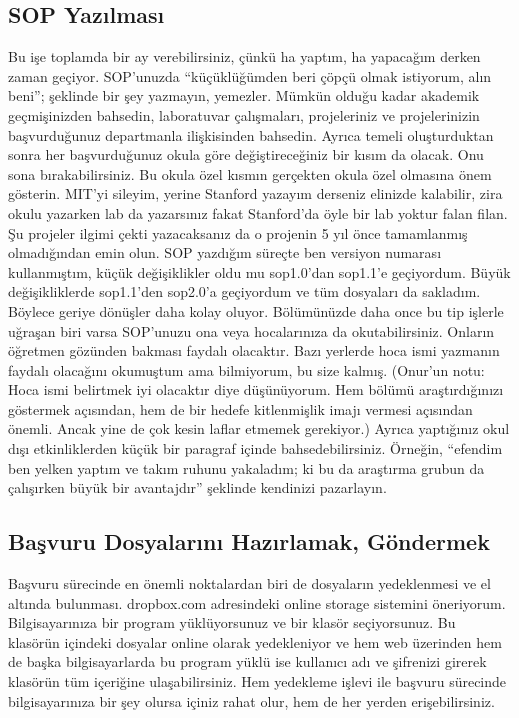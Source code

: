 \documentclass[12pt,a4paper]{article}
\begin{document}
\subsection{SOP Yazılması}
Bu işe toplamda bir ay verebilirsiniz, çünkü ha yaptım, ha yapacağım derken zaman geçiyor. SOP'unuzda ``küçüklüğümden beri çöpçü olmak istiyorum, alın beni''; şeklinde bir şey yazmayın, yemezler. Mümkün olduğu kadar akademik geçmişinizden bahsedin, laboratuvar çalışmaları, projeleriniz ve projelerinizin başvurduğunuz departmanla ilişkisinden bahsedin. Ayrıca temeli oluşturduktan sonra her başvurduğunuz okula göre değiştireceğiniz bir kısım da olacak. Onu sona bırakabilirsiniz. Bu okula özel kısmın gerçekten okula özel olmasına önem gösterin. MIT'yi sileyim, yerine Stanford yazayım derseniz eli\-nizde kalabilir, zira okulu yazarken lab da yazarsınız fakat Stanford'da öyle bir lab yoktur falan filan. Şu projeler ilgimi çekti yazacaksanız da o projenin 5 yıl önce tamamlanmış olmadığından emin olun. SOP yazdığım süreçte ben versiyon numarası kullanmıştım, küçük değişiklikler oldu mu sop1.0’dan sop1.1’e geçiyordum. Büyük değişikliklerde sop1.1’den sop2.0’a geçiyordum ve tüm dosyaları da sakladım. Böylece geriye dönüşler daha kolay oluyor. Bölümünüzde daha once bu tip işlerle uğraşan biri varsa SOP'unuzu ona veya hocalarınıza da okutabilirsiniz. Onların öğretmen gözünden bakması faydalı olacaktır. Bazı yerlerde hoca ismi yazmanın faydalı olacağını okumuştum ama bilmiyorum, bu size kalmış. (Onur'un notu: Hoca ismi belirtmek iyi olacaktır diye düşünüyorum. Hem bölümü araştırdığınızı göstermek açısından, hem de bir hedefe kitlenmişlik imajı vermesi açısından önemli. Ancak yine de çok kesin laflar etmemek gerekiyor.) Ayrıca yaptığınız okul dışı etkinliklerden küçük bir paragraf içinde bahsedebilirsiniz. Örneğin, ``efendim ben yelken yaptım ve takım ruhunu yakaladım; ki bu da araştırma grubun da çalışırken büyük bir avantajdır'' şeklinde  kendinizi pazarlayın. 

\subsection{Başvuru Dosyalarını Hazırlamak, Göndermek}
Başvuru sürecinde en önemli noktalardan biri de dosyaların yedeklenmesi ve el altında bulunması. dropbox.com adresindeki online storage sistemini öneriyorum. Bilgisayarınıza bir program yüklüyorsunuz ve bir klasör seçiyorsunuz. Bu klasörün içindeki dosyalar online olarak yedekleniyor ve hem web üzerinden hem de başka bilgisayarlarda bu program yüklü ise kullanıcı adı ve şifrenizi girerek klasörün tüm içeriğine ulaşabilirsiniz. Hem yedekleme işlevi ile başvuru sürecinde bilgisayarınıza bir şey olursa içiniz rahat olur, hem de her yerden erişebilirsiniz. 
\end{document}
